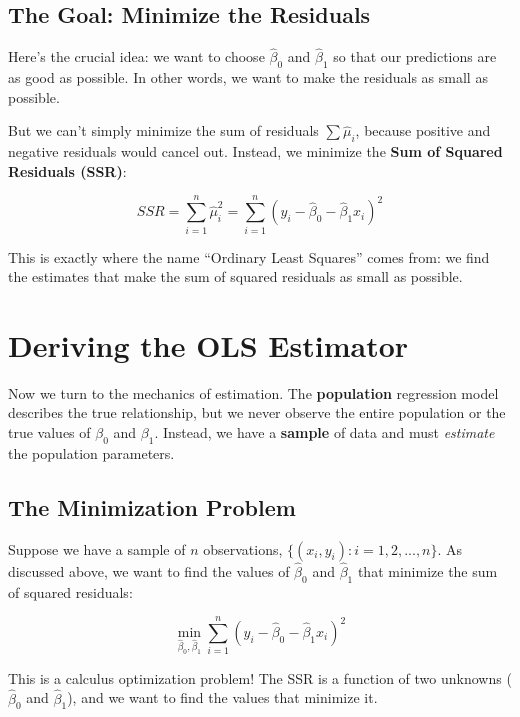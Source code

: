 \documentclass[
  letterpaper,
  DIV=11,
  numbers=noendperiod]{scrreprt}
\begin{document}
\subsection{The Goal: Minimize the
Residuals}\label{the-goal-minimize-the-residuals}

Here's the crucial idea: we want to choose \(\hat{\beta}_0\) and
\(\hat{\beta}_1\) so that our predictions are as good as possible. In
other words, we want to make the residuals as small as possible.

But we can't simply minimize the sum of residuals \(\sum \hat{\mu}_i\),
because positive and negative residuals would cancel out. Instead, we
minimize the \textbf{Sum of Squared Residuals (SSR)}:

\[
SSR = \sum_{i=1}^{n} \hat{\mu}_i^2 = \sum_{i=1}^{n} (y_i - \hat{\beta}_0 - \hat{\beta}_1 x_i)^2
\]

This is exactly where the name ``Ordinary Least Squares'' comes from: we
find the estimates that make the sum of squared residuals as small as
possible.

\section{Deriving the OLS Estimator}\label{deriving-the-ols-estimator}

Now we turn to the mechanics of estimation. The \textbf{population}
regression model describes the true relationship, but we never observe
the entire population or the true values of \(\beta_0\) and \(\beta_1\).
Instead, we have a \textbf{sample} of data and must \emph{estimate} the
population parameters.

\subsection{The Minimization Problem}\label{the-minimization-problem}

Suppose we have a sample of \(n\) observations,
\(\{(x_i, y_i): i = 1, 2, ..., n\}\). As discussed above, we want to
find the values of \(\hat{\beta}_0\) and \(\hat{\beta}_1\) that minimize
the sum of squared residuals:

\[
\min_{\hat{\beta}_0, \hat{\beta}_1} \sum_{i=1}^{n} (y_i - \hat{\beta}_0 - \hat{\beta}_1 x_i)^2
\]

This is a calculus optimization problem! The SSR is a function of two
unknowns (\(\hat{\beta}_0\) and \(\hat{\beta}_1\)), and we want to find
the values that minimize it.
\end{document}
